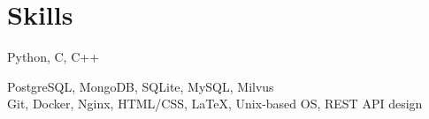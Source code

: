 \documentclass[]{resume-openfont}
\newcommand{\resumeHeading}[4]{\runsubsection{#1}{ | #2}\hfill\location{#3 | #4}\fakeNewLine}
\begin{document}




\vspace{-5pt}
\section{Skills}

 Python, C, C++ \\
\vspace{5pt}

 PostgreSQL, MongoDB, SQLite, MySQL, Milvus \\
\vspace{5pt}
 Git, Docker, Nginx, HTML/CSS, \LaTeX, Unix-based OS, REST API design \\
\sectionsep
\end{document}
